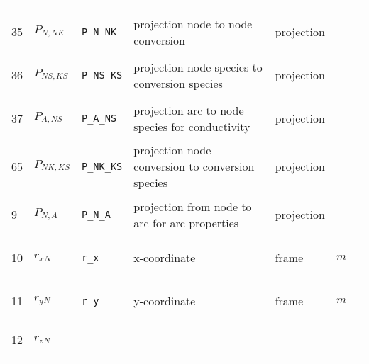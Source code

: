 \begin{longtable}{|p{1cm}|p{2.5cm}|p{4.5cm}|p{8cm}|p{3.0cm}|p{3cm}|p{1cm}|}
             & $  $
             & \\
            35
             & \hypertarget{"v:35"}{ $ {P}{_{N, {N K}}} $}
             & \verb|P_N_NK|
             & projection node to node conversion
             & \begin{lay}projection \end{lay}
             & $  $
             & \\
            36
             & \hypertarget{"v:36"}{ $ {P}{_{{N S}, {K S}}} $}
             & \verb|P_NS_KS|
             & projection node species to conversion species
             & \begin{lay}projection \end{lay}
             & $  $
             & \\
            37
             & \hypertarget{"v:37"}{ $ {P}{_{A, {N S}}} $}
             & \verb|P_A_NS|
             & projection arc to node species for conductivity
             & \begin{lay}projection \end{lay}
             & $  $
             & \\
            65
             & \hypertarget{"v:65"}{ $ {P}{_{{N K}, {K S}}} $}
             & \verb|P_NK_KS|
             & projection node conversion to conversion species
             & \begin{lay}projection \end{lay}
             & $  $
             & \\
            9
             & \hypertarget{"v:9"}{ $ {P}{_{N, A}} $}
             & \verb|P_N_A|
             & projection from node to arc for arc properties
             & \begin{lay}projection \end{lay}
             & $  $
             & \\
            10
             & \hypertarget{"v:10"}{ $ {{r_x}}{_{N}} $}
             & \verb|r_x|
             & x-coordinate
             & \begin{lay}frame \end{lay}
             & $ m  $
             & \\
            11
             & \hypertarget{"v:11"}{ $ {{r_y}}{_{N}} $}
             & \verb|r_y|
             & y-coordinate
             & \begin{lay}frame \end{lay}
             & $ m  $
             & \\
            12
             & \hypertarget{"v:12"}{ $ {{r_z}}{_{N}} $}

\end{longtable}
